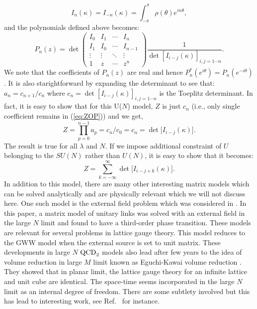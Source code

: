 \documentclass[11pt]{article}
\begin{document}
\begin{equation}
	I_{n}(\kappa) = I_{-n}(\kappa) = \int_{-\pi}^{\pi} \rho(\theta) e^{i n \theta}, 
\end{equation}
and the polynomials defined above becomes:
\begin{equation}
	P_{n}(z) = \det
	\begin{pmatrix}
		I_0 & I_1 & \cdots & I_n \\
		I_1 & I_0 & \cdots & I_{n-1} \\
		\vdots  & \vdots  & \ddots & \vdots  \\
		1 & z & \cdots & z^n 
			\end{pmatrix}
		 \frac{1}{\det [I_{i-j} (\kappa)]_{i,j = 1 \cdots n}}. 
\end{equation}
We note that the coefficients of $P_{n}(z)$ are real and hence $P_{n}^{*}(e^{i\theta}) = P_{n}(e^{-i\theta})$. It is also starightforward by expanding the determinant to see that: $a_{n} = c_{n+1}/c_{n}$ where $c_{n} = \det [I_{i-j}(\kappa)]_{i,j = 1 \cdots n}$ is the Toeplitz determinant. 
In fact, it is easy to show that for this U($N$) model, $Z$ is just $c_{n}$ (i.e., only single coefficient remains in (\ref{eq:ZOP})) and we get, 
\begin{equation}
\label{eq:GWW_ex} 
Z = \prod_{p=0}^{n-1} a_{p} = c_{n}/c_{0} = c_{n} = \det \Big[I_{i-j}(\kappa) \Big].
\end{equation}
The result is true for all $\lambda$ and $N$. If we impose additional constraint of 
$U$ belonging to the $SU(N)$ rather than $U(N)$, it is easy to show that
it becomes:
\begin{equation}
\label{eq:GWW_ex} 
Z = \sum_{k=-\infty}^{\infty} \det \Big[I_{i-j+k}(\kappa) \Big].
\end{equation}
In addition to this model, there are many other interesting matrix models which can be solved analytically
and are physically relevant which we will not discuss here. 
One such model is the external field problem which was considered in \cite{Brezin:1980rk}. In this paper, a matrix 
model of unitary links was solved with an external field in the large $N$ limit and found to have a third-order phase transition. These models are relevant for several problems in lattice gauge theory. This model reduces to the GWW model when the external source is set to unit matrix. These developments in large $N$ $\rm{QCD}_{2}$ models also lead after few years to the idea of volume reduction in large $M$ limit known as Eguchi-Kawai volume reduction \cite{Eguchi:1982nm}. They showed that in planar limit, the lattice gauge theory for an infinite lattice and unit cube are identical. The space-time seems incorporated in the large $N$ limit as an internal degree of freedom. There are some subtlety involved but this has lead to interesting work, see Ref.~\cite{Kovtun:2007py} for instance. 
\end{document}
